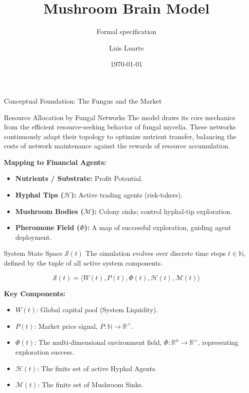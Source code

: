 \documentclass[aspectratio=169, 10pt]{beamer}
\title{Mushroom Brain Model}
\subtitle{Formal specification}
\author{Luis Luarte}
\institute{Agent-Based Systems Modeling}
\date{\today}
\newcommand{\StateSet}{\mathcal{S}}
\newcommand{\HyphaSet}{\mathcal{H}}
\newcommand{\MushroomSet}{\mathcal{M}}
\newcommand{\PheroField}{\Phi}
\begin{document}
	
	\begin{frame}
		\titlepage
	\end{frame}
	
	\begin{frame}{Conceptual Foundation: The Fungus and the Market}
		\begin{block}{Resource Allocation by Fungal Networks}
			The model draws its core mechanics from the efficient resource-seeking behavior of fungal mycelia. These networks continuously adapt their topology to optimize nutrient transfer, balancing the costs of network maintenance against the rewards of resource accumulation.
		\end{block}
		
		\vspace{0.3cm}
		
		\textbf{Mapping to Financial Agents:}
		\begin{itemize}
			\item \textbf{Nutrients / Substrate:} Profit Potential.
			\item \textbf{Hyphal Tips ($\mathcal{H}$):} Active trading agents (risk-takers).
			\item \textbf{Mushroom Bodies ($\mathcal{M}$):} Colony sinks; control hyphal-tip exploration.
			\item \textbf{Pheromone Field ($\PheroField$):} A map of successful exploration, guiding agent deployment.
		\end{itemize}
	\end{frame}
	
	\begin{frame}{System State Space $\StateSet(t)$}
		The simulation evolves over discrete time steps $t \in \mathbb{N}$, defined by the tuple of all active system components.
		
		\begin{equation*}
			\StateSet(t) = \langle W(t), P(t), \PheroField(t), \HyphaSet(t), \MushroomSet(t) \rangle
		\end{equation*}
		
		\vspace{0.3cm}
		\textbf{Key Components:}
		\begin{itemize}
			\item $W(t)$: Global capital pool (System Liquidity).
			\item $P(t)$: Market price signal, $P: \mathbb{N} \to \mathbb{R}^{+}$.
			\item $\PheroField(t)$: The multi-dimensional environment field, $\PheroField: \mathbb{R}^n \to \mathbb{R}^{+}$, representing exploration success.
			\item $\HyphaSet(t)$: The finite set of active Hyphal Agents.
			\item $\MushroomSet(t)$: The finite set of Mushroom Sinks.
		\end{itemize}
	\end{frame}
	
\end{document}
